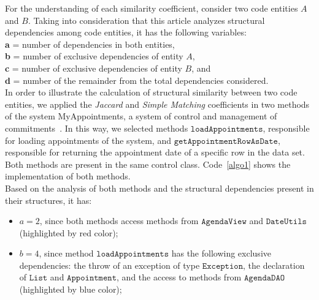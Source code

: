 \documentclass[smallextended,natbib]{svjour3}
\newcommand{\tab}{\text{}\text{}\text{}}
\newcommand{\mcode}[1]{{$\mathtt{#1}$}}
\begin{document}
{For the understanding of each similarity coefficient, consider two code entities $A$ and $B$. Taking into consideration that this article analyzes structural dependencies among code entities, it has the following variables:\\[-0.2cm]

\tab\textbf{a} = number of dependencies in both entities,\\[-0.4cm]

\tab\textbf{b} = number of exclusive dependencies of entity $A$,\\[-0.4cm]

\tab\textbf{c} = number of exclusive dependencies of entity $B$, and\\[-0.4cm]

\tab\textbf{d} = number of the remainder from the total dependencies considered.\\[-0.2cm]

In order to illustrate the calculation of structural similarity between two code entities, we applied the \textit{Jaccard} and \textit{Simple Matching} coefficients in two methods of the system MyAppointments, a system of control and management of commitments~\citep{leoterr}. In this way, we selected methods \mcode{loadAppointments}, responsible for loading appointments of the system, and \mcode{getAppointmentRowAsDate}, responsible for returning the appointment date of a specific row in the data set. Both methods are present in the same control class. Code~\ref{algo1} shows the implementation of both methods.\\[-0.2cm] %

Based on the analysis of both methods and the structural dependencies present in their structures, it has:

\begin{itemize}
    \item $a = 2$, since both methods access methods from \mcode{AgendaView} and \mcode{DateUtils} (highlighted by red color);\\
    \item $b = 4$, since method \mcode{loadAppointments} has the following exclusive dependencies: the throw of an exception of type \mcode{Exception}, the declaration of \mcode{List} and \mcode{Appointment}, and the access to methods from \mcode{AgendaDAO} (highlighted by blue color);
\end{itemize}

}
\end{document}

